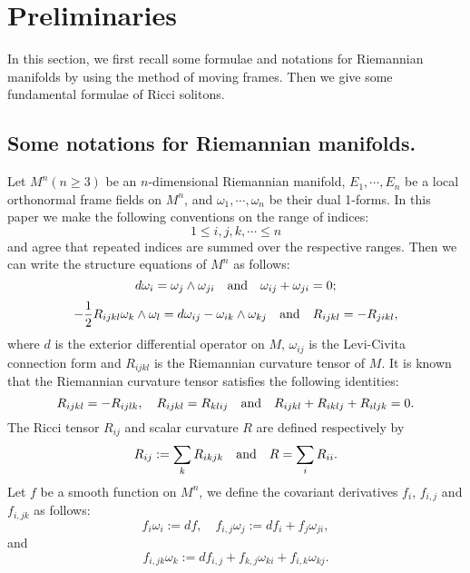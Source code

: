 \documentclass{amsart}
\theoremstyle{definition}
\theoremstyle{remark}
\numberwithin{equation}{section}
\begin{document}
\section{Preliminaries}
In this section, we first recall some formulae and notations 
for Riemannian manifolds by using the method of moving frames.
Then we give some fundamental formulae of Ricci solitons.

\subsection{Some notations for Riemannian manifolds.}
Let $M^{n}(n \geq 3)$ be an
$n$-dimensional Riemannian manifold,
$E_{1}, \cdots, E_{n}$ be a local orthonormal frame
fields on $M^{n}$, and $\omega_{1}, \cdots, \omega_{n}$
be their dual 1-forms. In this paper we make the following
conventions on the range of indices:
\[
1\leq i,j,k,\cdots\leq n
\]
and agree that repeated indices are summed over the respective ranges. 
Then we can write the structure equations of $M^{n}$ as follows:
\begin{equation}\label{2.1}
d\omega_{i}=\omega_{j}\wedge\omega_{ji}
\quad {\rm and }\quad \omega_{ij}+\omega_{ji}=0;
\end{equation}
\begin{equation}\label{2.2}
-\frac{1}{2}R_{ijkl}\omega_{k}\wedge\omega_{l}=
d\omega_{ij}-\omega_{ik}\wedge\omega_{kj}
\quad {\rm and }\quad R_{ijkl}=-R_{jikl},
\end{equation}
where $d$ is the exterior differential operator on $M$,
$\omega_{ij}$ is the Levi-Civita connection form
and $R_{ijkl}$ is the Riemannian curvature tensor of $M$.
It is known that the Riemannian curvature tensor satisfies
the following identities:
\begin{equation}\label{2.3}
R_{ijkl}=-R_{ijlk}, \quad R_{ijkl}=R_{klij}
\quad {\rm and }\quad R_{ijkl}+R_{iklj}+R_{iljk}=0.
\end{equation}
The Ricci tensor $R_{ij}$ and scalar curvature $R$ are defined respectively by
\begin{equation}\label{2.4}
R_{ij}:=\sum\limits_{k}R_{ikjk} \quad {\rm and }\quad R=\sum\limits_{i}R_{ii}.
\end{equation}
Let $f$ be a smooth function on $M^{n}$, we define the
covariant derivatives $f_{i}$, $f_{i,j}$ and $f_{i,jk}$ as follows:
\begin{equation}\label{2.5}
f_{i}\omega_{i}:=df,\quad  f_{i,j}\omega_{j}:=df_{i}+f_{j}\omega_{ji},
\end{equation}
and
\begin{equation}\label{2.6}
f_{i,jk}\omega_{k}:=df_{i,j}+f_{k,j}\omega_{ki}+f_{i,k}\omega_{kj}.
\end{equation}
\end{document}
